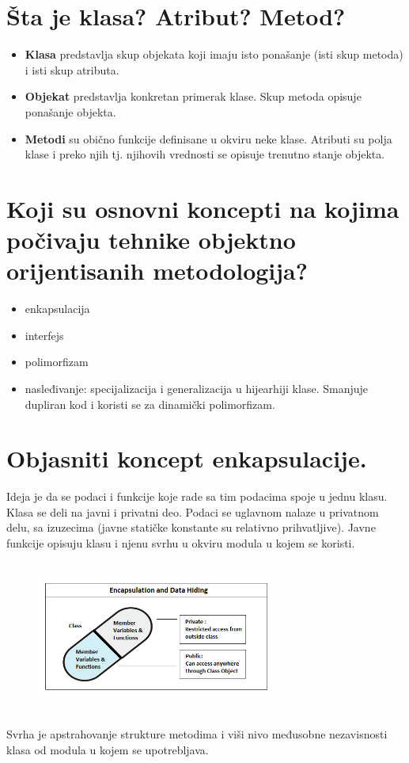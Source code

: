 \documentclass[a4paper]{article}
\begin{document}
\section{Šta je klasa? Atribut? Metod?}
  \begin{itemize}
    \item \textbf{Klasa} predstavlja skup objekata koji imaju isto ponašanje (isti skup metoda) 
          i isti skup atributa. 
    \item \textbf{Objekat} predstavlja konkretan primerak klase. Skup metoda opisuje ponašanje objekta. 
    \item \textbf{Metodi} su obično funkcije definisane u okviru neke klase. Atributi su polja klase 
          i preko njih tj. njihovih vrednosti se opisuje trenutno stanje objekta.
  \end{itemize}

\section{Koji su osnovni koncepti na kojima počivaju tehnike objektno orijentisanih metodologija?}
  \begin{itemize}
    \item enkapsulacija
    \item interfejs
    \item polimorfizam
    \item nasleđivanje: specijalizacija i generalizacija u hijearhiji klase. Smanjuje dupliran kod i
          koristi se za dinamički polimorfizam.
  \end{itemize}

\section{Objasniti koncept enkapsulacije.}
  Ideja je da se podaci i funkcije koje rade sa tim podacima spoje u jednu klasu. Klasa se deli
  na javni i privatni deo. Podaci se uglavnom nalaze u privatnom delu, sa izuzecima (javne statičke 
  konstante su relativno prihvatljive). Javne funkcije opisuju klasu i njenu svrhu u okviru modula
  u kojem se koristi.
  \begin{figure}[H]
    \begin{center}
        \includegraphics[width=80mm,height=50mm]{Slike/encapsulation.png}
    \end{center}
  \end{figure}
  Svrha je apstrahovanje strukture metodima i viši nivo međusobne nezavisnosti klasa od modula u
  kojem se upotrebljava.
\end{document}
